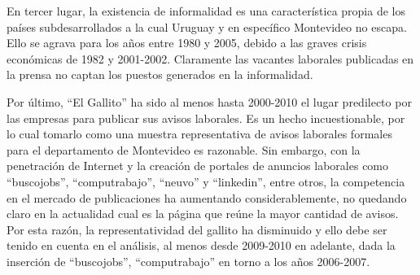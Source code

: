 %

En tercer lugar, la existencia de informalidad es una característica propia de los países subdesarrollados a la cual Uruguay y en específico Montevideo no escapa. Ello se agrava para los años entre 1980 y 2005, debido a las graves crisis económicas de 1982 y 2001-2002. Claramente las vacantes laborales publicadas en la prensa no captan los puestos generados en la informalidad.

Por último, ``El Gallito'' ha sido al menos hasta 2000-2010 el lugar predilecto por las empresas para publicar sus avisos laborales. Es un hecho incuestionable, por lo cual tomarlo como una muestra representativa de avisos laborales formales para el departamento de Montevideo es razonable. Sin embargo, con la penetración de Internet y la creación de portales de anuncios laborales como ``buscojobs'', ``computrabajo'', ``neuvo'' y ``linkedin'', entre otros, la competencia en el mercado de publicaciones ha aumentando considerablemente, no quedando claro en la actualidad cual es la página que reúne la mayor cantidad de avisos. Por esta razón, la representatividad del gallito ha disminuido y ello debe ser tenido en cuenta en el análisis, al menos desde 2009-2010 en adelante, dada la inserción de ``buscojobs'', ``computrabajo'' en torno a los años 2006-2007.


